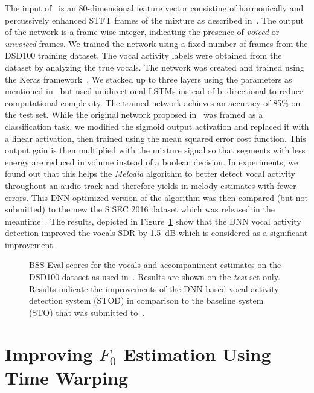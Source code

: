 The input of~\cite{Leglaive15} is an 80-dimensional feature vector consisting of harmonically and percussively enhanced \acs{STFT} frames of the mixture as described in~\cite{ono08}.
The output of the network is a frame-wise integer, indicating the presence of \emph{voiced} or \emph{unvoiced} frames.
We trained the network using a fixed number of frames from the DSD100 training dataset.
The vocal activity labels were obtained from the dataset by analyzing the true vocals.
The network was created and trained using the Keras framework~\cite{chollet15}.
We stacked up to three layers using the parameters as mentioned in~\cite{Leglaive15} but used unidirectional LSTMs instead of bi-directional to reduce computational complexity.
The trained network achieves an accuracy of 85\% on the test set.
While the original network proposed in~\cite{Leglaive15} was framed as a classification task, we modified the sigmoid output activation and replaced it with a linear activation, then trained using the mean squared error cost function.
This output gain is then multiplied with the mixture signal so that segments with less energy are reduced in volume instead of a boolean decision.
In experiments, we found out that this helps the \emph{Melodia} algorithm to better detect vocal activity throughout an audio track and therefore yields in melody estimates with fewer errors.
This DNN-optimized version of the algorithm was then compared (but not submitted) to the new the \acs{SiSEC} 2016 dataset which was released in the meantime~\cite{liutkus17}.
The results, depicted in Figure~\ref{fig:05_comparison_sto_stodnn} show that the DNN vocal activity detection improved the vocals \acs{SDR} by 1.5~dB which is considered as a significant improvement.

\begin{figure}
  \centering
  
  \caption{BSS Eval scores for the vocals and accompaniment estimates on the DSD100 dataset as used in~\cite{liutkus17}. Results are shown on the \emph{test} set only. Results indicate the improvements of the DNN based vocal activity detection system (\textsc{STOD}) in comparison to the baseline system (\textsc{STO}) that was submitted to~\cite{ono15}.}
  \label{fig:05_comparison_sto_stodnn}
\end{figure}

\section[Improving $F_0$ Estimation Using Time Warping]{Improving $F_0$ Estimation Using\\Time Warping} %
\label{sec:f0method}

